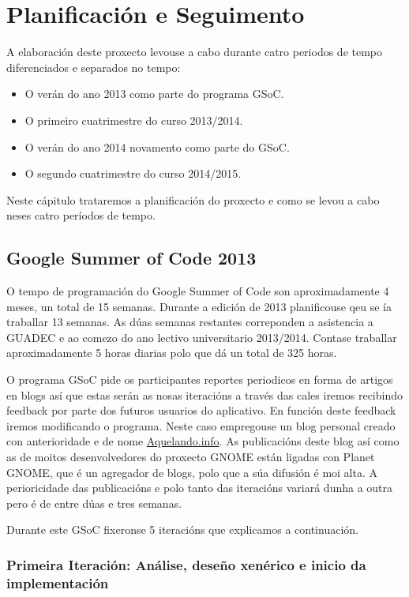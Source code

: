 \chapter{Planificación e Seguimento}

A elaboración deste proxecto levouse a cabo durante catro periodos de tempo diferenciados e separados no tempo:

\begin{itemize}
  \item O verán do ano 2013 como parte do programa GSoC.
  \item O primeiro cuatrimestre do curso 2013/2014.
  \item O verán do ano 2014 novamento como parte do GSoC.
  \item O segundo cuatrimestre do curso 2014/2015.
\end{itemize}

Neste cápitulo trataremos a planificación do proxecto e como se levou a cabo neses catro períodos de tempo.

\section{Google Summer of Code 2013}
O tempo de programación do Google Summer of Code son aproximadamente 4 meses, un total de 15 semanas. Durante a edición de 2013 planificouse qeu se ía traballar 13 semanas. As dúas semanas restantes correponden a asistencia a GUADEC e ao comezo do ano lectivo universitario 2013/2014. Contase traballar aproximadamente 5 horas diarias polo que dá un total de 325 horas.

O programa GSoC pide os participantes reportes periodicos en forma de artigos en blogs así que estas serán as nosas iteracións a través das cales iremos recibindo feedback por parte dos futuros usuarios do aplicativo. En función deste feedback iremos modificando o programa. Neste caso empregouse un blog personal creado con anterioridade e de nome \href{http://aquelando.info}{Aquelando.info}. As publicacións deste blog así como as de moitos desenvolvedores do proxecto GNOME están ligadas con Planet GNOME, que é un agregador de blogs, polo que a súa difusión é moi alta. A perioricidade das publicacións e polo tanto das iteracións variará dunha a outra pero é de entre dúas e tres semanas.

Durante este GSoC fixeronse 5 iteracións que explicamos a continuación.

\subsection{Primeira Iteración: Análise, deseño xenérico e inicio da implementación}

